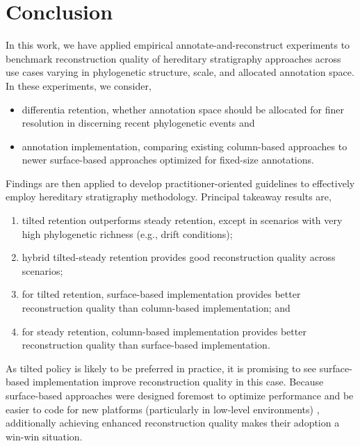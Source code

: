 \section{Conclusion} \label{sec:conclusion}

In this work, we have applied empirical annotate-and-reconstruct experiments to benchmark reconstruction quality of hereditary stratigraphy approaches across use cases varying in phylogenetic structure, scale, and allocated annotation space.
In these experiments, we consider,
\begin{itemize}
\item differentia retention, whether annotation space should be allocated for finer resolution in discerning recent phylogenetic events and
\item annotation implementation, comparing existing column-based approaches to newer surface-based approaches optimized for fixed-size annotations.
\end{itemize}

Findings are then applied to develop practitioner-oriented guidelines to effectively employ hereditary stratigraphy methodology.
Principal takeaway results are,
\begin{enumerate}
\item tilted retention outperforms steady retention, except in scenarios with very high phylogenetic richness (e.g., drift conditions);
\item hybrid tilted-steady retention provides good reconstruction quality across scenarios;
\item for tilted retention, surface-based implementation provides better reconstruction quality than column-based implementation; and
\item for steady retention, column-based implementation provides better reconstruction quality than surface-based implementation.
\end{enumerate}
As tilted policy is likely to be preferred in practice, it is promising to see surface-based implementation improve reconstruction quality in this case.
Because surface-based approaches were designed foremost to optimize performance and be easier to code for new platforms (particularly in low-level environments) \citep{moreno2024trackable}, additionally achieving enhanced reconstruction quality makes their adoption a win-win situation.

